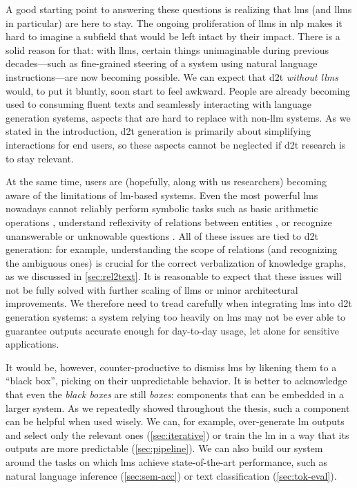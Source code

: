 A good starting point to answering these questions is realizing that \aclp{lm} (and \acsp{llm} in particular) are here to stay. The ongoing proliferation of \acp{llm} in \acl{nlp} \cite{min2023recent,zhao2023survey,naveed2024comprehensive} makes it hard to imagine a subfield that would be left intact by their impact. There is a solid reason for that: with \acp{llm}, certain things unimaginable during previous decades---such as fine-grained steering of a system using natural language instructions---are now becoming possible. We can expect that \ac{d2t} \emph{without \acp{llm}} would, to put it bluntly, soon start to feel awkward. People are already becoming used to consuming fluent texts and seamlessly interacting with language generation systems, aspects that are hard to replace with non-\ac{llm} systems. As we stated in the introduction, \ac{d2t} generation is primarily about simplifying interactions for end users, so these aspects cannot be neglected if \ac{d2t} research is to stay relevant.

At the same time, users are (hopefully, along with us researchers) becoming aware of the limitations of \ac{lm}-based systems. Even the most powerful \acp{lm} nowadays cannot reliably perform symbolic tasks such as basic arithmetic operations \cite{qian2023limitations}, understand reflexivity of relations between entities \cite{berglund2024the}, or recognize unanswerable or unknowable questions \cite{yin2023large}. All of these issues are tied to \ac{d2t} generation: for example, understanding the scope of relations (and recognizing the ambiguous ones) is crucial for the correct verbalization of knowledge graphs, as we discussed in \autoref{sec:rel2text}. It is reasonable to expect that these issues will not be fully solved with further scaling of \acp{llm} or minor architectural improvements. We therefore need to tread carefully when integrating \acp{lm} into \ac{d2t} generation systems: a system relying too heavily on \acp{lm} may not be ever able to guarantee outputs accurate enough for day-to-day usage, let alone for sensitive applications.

It would be, however, counter-productive to dismiss \acp{lm} by likening them to a ``black box'', picking on their unpredictable behavior. It is better to acknowledge that even the \emph{black boxes} are still \emph{boxes}: components that can be embedded in a larger system. As we repeatedly showed throughout the thesis, such a component can be helpful when used wisely. We can, for example, over-generate \ac{lm} outputs and select only the relevant ones (\autoref{sec:iterative}) or train the \ac{lm} in a way that its outputs are more predictable (\autoref{sec:pipeline}). We can also build our system around the tasks on which \acp{lm} achieve state-of-the-art performance, such as natural language inference (\autoref{sec:sem-acc}) or text classification (\autoref{sec:tok-eval}).

